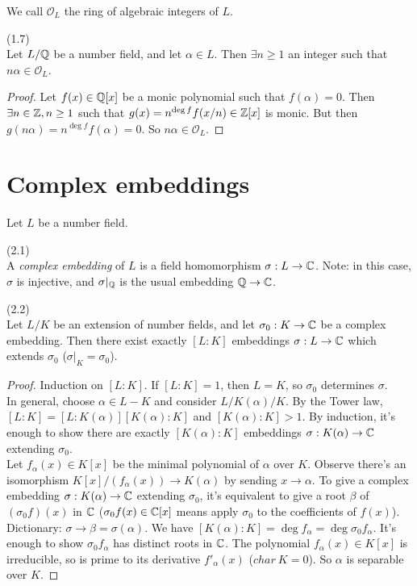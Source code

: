 \documentclass[a4paper]{article}
\begin{document}
We call $\mathcal{O}_L$ the ring of algebraic integers of $L$.

\begin{lemma} (1.7)\\
Let $L/\mathbb{Q}$ be a number field, and let $\alpha \in L$. Then $\exists n \geq 1$ an integer such that $n\alpha \in \mathcal{O}_L$.
\begin{proof}
Let $f(x) \in \mathbb{Q}[x]$ be a monic polynomial such that $f(\alpha) = 0$. Then $\exists n\in \mathbb{Z}, n \geq 1$ such that $g(x) = n^{\deg f} f(x/n) \in \mathbb{Z}[x]$ is monic. But then $g(n\alpha) = n^{\deg f} f(\alpha) = 0$. So $n\alpha \in \mathcal{O}_L$.
\end{proof}
\end{lemma}

\newpage

\section{Complex embeddings}
Let $L$ be a number field.
\begin{defi} (2.1)\\
A \emph{complex embedding} of $L$ is a field homomorphism $\sigma: L \to \mathbb{C}$. Note: in this case, $\sigma$ is injective, and $\sigma|_{\mathbb{Q}}$ is the usual embedding $\mathbb{Q} \to \mathbb{C}$.
\end{defi}

\begin{prop} (2.2)\\
Let $L/K$ be an extension of number fields, and let $\sigma_0:K \to \mathbb{C}$ be a complex embedding. Then there exist exactly $[L:K]$ embeddings $\sigma:L \to \mathbb{C}$ which extends $\sigma_0$ ($\sigma|_K = \sigma_0$).
\begin{proof}
Induction on $[L:K]$. If $[L:K] = 1$, then $L=K$, so $\sigma_0$ determines $\sigma$.\\
In general, choose $\alpha \in L-K$ and consider $L/K(\alpha)/K$. By the Tower law, $[L:K] = [L:K(\alpha)][K(\alpha):K]$ and $[K(\alpha):K]>1$. By induction, it's enough to show there are exactly $[K(\alpha):K]$ embeddings $\sigma:K(\alpha) \to \mathbb{C}$ extending $\sigma_0$.\\
Let $f_\alpha(x) \in K[x]$ be the minimal polynomial of $\alpha$ over $K$. Observe there's an isomorphism $K[x] / (f_\alpha(x)) \to K(\alpha)$ by sending $x \to \alpha$. To give a complex embedding $\sigma:K(\alpha) \to \mathbb{C}$ extending $\sigma_0$, it's equivalent to give a root $\beta$ of $(\sigma_0 f)(x)$ in $\mathbb{C}$ ($\sigma_0 f(x) \in \mathbb{C}[x]$ means apply $\sigma_0$ to the coefficients of $f(x)$). Dictionary: $\sigma \to \beta = \sigma (\alpha)$. We have $[K(\alpha):K] = \deg f_\alpha = \deg \sigma_0 f_\alpha$. It's enough to show $\sigma_0 f_\alpha$ has distinct roots in $\mathbb{C}$. The polynomial $f_\alpha(x) \in K[x]$ is irreducible, so is prime to its derivative $f'_\alpha(x)$ ($char\ K =0$). So $\alpha$ is separable over $K$.
\end{proof}
\end{prop}
\end{document}
